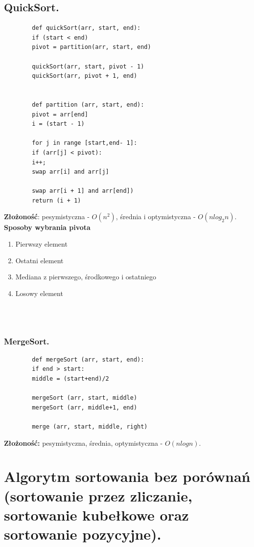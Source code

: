 \documentclass[12pt]{article}
\begin{document}
    \subsection{QuickSort.}

    \begin{verbatim}
        def quickSort(arr, start, end):
        if (start < end)
        pivot = partition(arr, start, end)

        quickSort(arr, start, pivot - 1)
        quickSort(arr, pivot + 1, end)


        def partition (arr, start, end):
        pivot = arr[end]
        i = (start - 1)

        for j in range [start,end- 1]:
        if (arr[j] < pivot):
        i++;
        swap arr[i] and arr[j]

        swap arr[i + 1] and arr[end])
        return (i + 1)
    \end{verbatim}
    \textbf{Złożoność}: pesymistyczna - $O(n^2)$, średnia i optymistyczna - $O(nlog_2 n)$.\\

    \textbf{Sposoby wybrania pivota}
    \begin{enumerate}
        \item Pierwszy element
        \item Ostatni element
        \item Mediana z pierwszego, środkowego i ostatniego
        \item Losowy element
    \end{enumerate}
    \hfill \\\\

    \subsubsection{MergeSort.}

    \begin{verbatim}
        def mergeSort (arr, start, end):
        if end > start:
        middle = (start+end)/2

        mergeSort (arr, start, middle)
        mergeSort (arr, middle+1, end)

        merge (arr, start, middle, right)
    \end{verbatim}
    \textbf{Złożoność:} pesymistyczna, średnia, optymistyczna - $O(nlogn)$.

    \newpage

    \section{Algorytm sortowania bez porównań (sortowanie przez zliczanie, sortowanie kubełkowe oraz sortowanie pozycyjne).}
\end{document}
